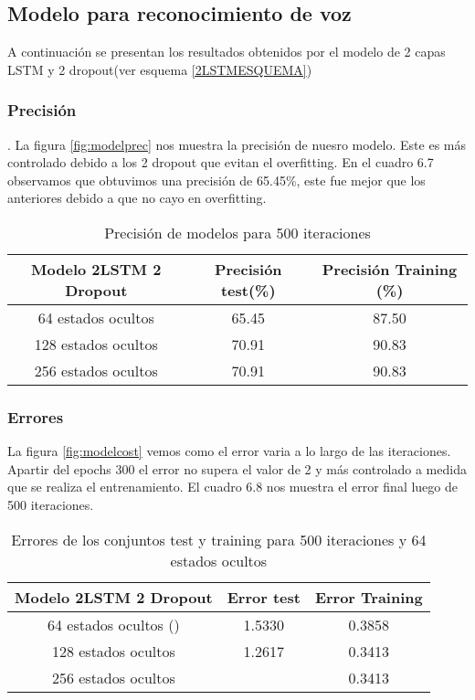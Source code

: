 \subsection{Modelo para reconocimiento de voz}
A continuación se presentan los resultados obtenidos por el modelo de 2 capas LSTM y 2 dropout(ver esquema \ref{2LSTMESQUEMA})
\subsubsection{Precisión}
. La figura \ref{fig:modelprec} nos muestra la precisión de nuesro modelo. Este es más controlado debido a los 2 dropout que evitan el overfitting.
En el cuadro 6.7 observamos que obtuvimos una precisión de 65.45\%, este fue mejor que los anteriores debido a que no cayo en overfitting.


\begin{table}[H]
	\centering
	\begin{tabular}{|c|c|c|}
		\hline
		\rowcolor{Gray}  Modelo 2LSTM 2 Dropout & Precisión test(\%) & Precisión Training (\%)\\ \hline
		64 estados ocultos&     65.45    &                87.50  \\ \hline
		128 estados ocultos&	70.91		&					90.83	\\ \hline
		256 estados ocultos&	70.91		&					90.83	\\ \hline
	\end{tabular}
	\caption{Precisión de modelos para 500 iteraciones }
\end{table}
\subsubsection{Errores}
La figura \ref{fig:modelcost} vemos como el error varia a lo largo de las iteraciones. Apartir del epochs 300 el error no supera el valor de 2 y más controlado a medida que se realiza el entrenamiento. 
\newpage
El cuadro 6.8 nos muestra el error final luego de 500 iteraciones.
\begin{table}[H]
	\centering
	\begin{tabular}{|c|c|c|}
		\hline
		\rowcolor{Gray}  Modelo 2LSTM 2 Dropout & Error test& Error Training \\ \hline
		64 estados ocultos ()&        1.5330 &             0.3858     \\ \hline
		128 estados ocultos	&		1.2617 	&				0.3413   \\ \hline
		256 estados ocultos	&				&				0.3413   \\ \hline
	\end{tabular}
	\caption{Errores de los conjuntos test y training para 500 iteraciones y 64 estados ocultos}
\end{table}